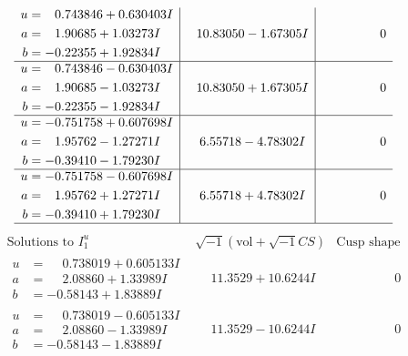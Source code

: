 \documentclass[1p]{elsarticle_modified}
\theoremstyle{definition}
\newcommand{\I}{\sqrt{-1}}
\begin{document}
$$\begin{array}{c|c|c}
\begin{aligned}
u &= \phantom{-}0.743846 + 0.630403 I \\
a &= \phantom{-}1.90685 + 1.03273 I \\
b &= -0.22355 + 1.92834 I\end{aligned}
 & \phantom{-}10.83050 - 1.67305 I & \phantom{-0.000000 } 0 \\ \hline\begin{aligned}
u &= \phantom{-}0.743846 - 0.630403 I \\
a &= \phantom{-}1.90685 - 1.03273 I \\
b &= -0.22355 - 1.92834 I\end{aligned}
 & \phantom{-}10.83050 + 1.67305 I & \phantom{-0.000000 } 0 \\ \hline\begin{aligned}
u &= -0.751758 + 0.607698 I \\
a &= \phantom{-}1.95762 - 1.27271 I \\
b &= -0.39410 - 1.79230 I\end{aligned}
 & \phantom{-}6.55718 - 4.78302 I & \phantom{-0.000000 } 0 \\ \hline\begin{aligned}
u &= -0.751758 - 0.607698 I \\
a &= \phantom{-}1.95762 + 1.27271 I \\
b &= -0.39410 + 1.79230 I\end{aligned}
 & \phantom{-}6.55718 + 4.78302 I & \phantom{-0.000000 } 0\\
 \hline 
 \end{array}$$\newpage$$\begin{array}{c|c|c}  
\text{Solutions to }I^u_{1}& \I (\text{vol} + \sqrt{-1}CS) & \text{Cusp shape}\\
 \hline 
\begin{aligned}
u &= \phantom{-}0.738019 + 0.605133 I \\
a &= \phantom{-}2.08860 + 1.33989 I \\
b &= -0.58143 + 1.83889 I\end{aligned}
 & \phantom{-}11.3529 + 10.6244 I & \phantom{-0.000000 } 0 \\ \hline\begin{aligned}
u &= \phantom{-}0.738019 - 0.605133 I \\
a &= \phantom{-}2.08860 - 1.33989 I \\
b &= -0.58143 - 1.83889 I\end{aligned}
 & \phantom{-}11.3529 - 10.6244 I & \phantom{-0.000000 } 0 \\ \hline\begin{aligned}

\end{aligned}
\end{array}$$
\end{document}
